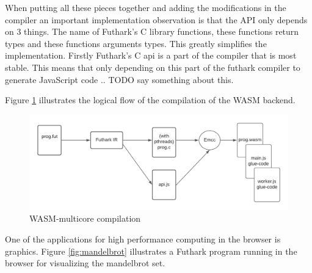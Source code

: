 \documentclass[11pt]{book}
\begin{document}
When putting all these pieces together and adding the modifications in the compiler an important implementation observation is that the API only depends on 3 things. The name of Futhark's C library functions, these functions return types and these functions arguments types. This greatly simplifies the implementation. Firstly Futhark's C api is a part of the compiler that is most stable. This means that only depending on this part of the futhark compiler to generate JavaScript code .. TODO say something about this. 



Figure \ref{fig:wasm} illustrates the logical flow of the compilation of the WASM backend. 

\begin{figure}[htbp]
\centerline{\includegraphics[width=\textwidth]{figures/WASM_MC_compiler.png}}
\caption{WASM-multicore compilation}
\label{fig:wasm}
\end{figure}





One of the applications for high performance computing in the browser is graphics. Figure \ref{fig:mandelbrot} illustrates a Futhark program running in the browser for visualizing the mandelbrot set. 
\end{document}
